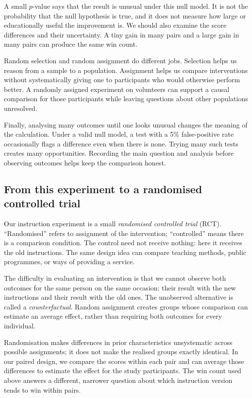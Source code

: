 A small $p$-value says that the result is unusual under this null model.
It is not the probability that the null hypothesis is true, and it does
not measure how large or educationally useful the improvement is.
We should also examine the score differences and their uncertainty.
A tiny gain in many pairs and a large gain in many pairs can produce the
same win count.

Random selection and random assignment do different jobs. Selection helps
us reason from a sample to a population. Assignment helps us compare
interventions without systematically giving one to participants who would
otherwise perform better. A randomly assigned experiment on volunteers
can support a causal comparison for those participants while leaving
questions about other populations unresolved.

Finally, analysing many outcomes until one looks unusual changes the
meaning of the calculation. Under a valid null model, a test with a 5\%
false-positive rate occasionally flags a difference even when there is
none. Trying many such tests creates many opportunities. Recording the
main question and analysis before observing outcomes helps keep the
comparison honest.

\subsection{From this experiment to a randomised controlled trial}
\label{sec:ds-rct}
Our instruction experiment is a small \emph{randomised controlled trial}
(RCT). ``Randomised'' refers to assignment of the intervention; ``controlled''
means there is a comparison condition. The control need not receive
nothing: here it receives the old instructions. The same design idea can
compare teaching methods, public programmes, or ways of providing a service.

The difficulty in evaluating an intervention is that we cannot observe
both outcomes for the same person on the same occasion: their result with
the new instructions and their result with the old ones. The unobserved
alternative is called a \emph{counterfactual}. Random assignment creates
groups whose comparison can estimate an average effect, rather than
requiring both outcomes for every individual.

Randomisation makes differences in prior characteristics unsystematic
across possible assignments; it does not make the realised groups exactly
identical. In our paired design, we compare the scores within each pair
and can average those differences to estimate the effect for the study
participants. The win count used above answers a different, narrower
question about which instruction version tends to win within pairs.

